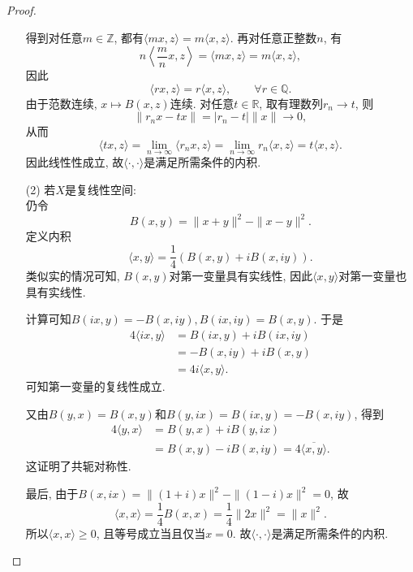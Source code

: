 \begin{proof}
\begin{itemize}
        得到对任意$m\in\mathbb Z$, 都有$\langle mx,z\rangle =m\langle x,z\rangle $.
        再对任意正整数$n$, 有
        $$n\left\langle \frac{m}{n}x,z\right\rangle 
        =\langle mx,z\rangle =m\langle x,z\rangle ,$$
        因此
        $$\langle rx,z\rangle =r\langle x,z\rangle ,\qquad \forall r\in\mathbb Q.$$
        由于范数连续, $x\mapsto B(x,z)$连续.
        对任意$t\in\mathbb R$, 取有理数列$r_n\to t$, 则
        $$\|r_nx-tx\|=|r_n-t|\|x\|\to0,$$
        从而
        $$\langle tx,z\rangle =\lim_{n\to\infty}\langle r_nx,z\rangle 
        =\lim_{n\to\infty}r_n\langle x,z\rangle =t\langle x,z\rangle .$$
        因此线性性成立, 故$\langle \cdot,\cdot\rangle $是满足所需条件的内积.

        \item[(2)] 若$X$是复线性空间: \\
        仍令
        $$B(x,y)=\|x+y\|^2-\|x-y\|^2.$$
        定义内积
        $$\langle x,y\rangle =\frac{1}{4}(B(x,y)+iB(x,iy)).$$
        类似实的情况可知,
        $B(x,y)$对第一变量具有实线性, 因此$\langle x,y\rangle $对第一变量也具有实线性.

        计算可知$B(ix,y)=-B(x,iy),B(ix,iy)=B(x,y)$. 
        于是
        \begin{align*}
            4\langle ix,y\rangle 
            &=B(ix,y)+iB(ix,iy)\\
            &=-B(x,iy)+iB(x,y)\\
            &=4i\langle x,y\rangle .
        \end{align*}
        可知第一变量的复线性成立.

        又由$B(y,x)=B(x,y)$和$B(y,ix)=B(ix,y)=-B(x,iy)$, 得到
        \begin{align*}
            4\langle y,x\rangle 
            &=B(y,x)+iB(y,ix)\\
            &=B(x,y)-iB(x,iy)
            =4\overline{\langle x,y\rangle }.
        \end{align*}
        这证明了共轭对称性. 

        最后, 由于$B(x,ix)=\|(1+i)x\|^2-\|(1-i)x\|^2=0$, 故
        $$\langle x,x\rangle =\frac14B(x,x)
        =\frac14\|2x\|^2=\|x\|^2.$$
        所以$\langle x,x\rangle \ge0$, 且等号成立当且仅当$x=0$.
        故$\langle \cdot,\cdot\rangle $是满足所需条件的内积.
    \end{itemize}
\end{proof}

